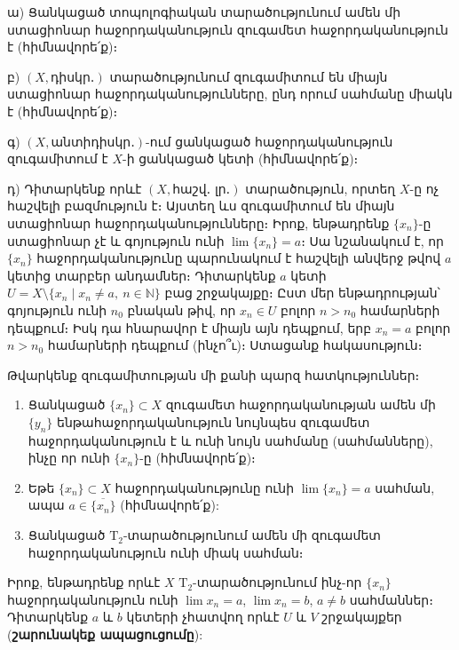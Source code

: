 \documentclass[./main.tex]{subfiles}
\begin{document}
\begin{example}\label{ch10ex1}
ա) Ցանկացած տոպոլոգիական տարածությունում ամեն մի ստա\-ցիո\-նար հա\-ջոր\-դա\-կանություն զուգամետ հաջորդականություն է (հիմնավորե՛ք)։
\par բ) $(X, \textrm{դիսկր․})$ տարածությունում զուգամիտում են միայն ստացիո\-նար հաջոր\-դա\-կանությունները, ընդ որում սահմանը միակն է (հիմնավորե՛ք)։
\par գ)  $(X, \textrm{անտիդիսկր․})$-ում ցանկացած հաջորդականություն զուգամիտում է $X$-ի ցանկացած կետի (հիմնավորե՛ք)։

\par դ) Դիտարկենք որևէ $(X, \textrm{հաշվ․ լր․})$ տարածություն, որտեղ $X$-ը ոչ հաշվելի բազ\-մու\-թյուն է։ Այստեղ ևս զուգամիտում են միայն ստացիոնար հաջորդականություն\-ները։ Իրոք, ենթադրենք $\{x_n\}$-ը ստացիոնար չէ և գոյություն ունի $\lim \{x_n\}=a$։ Սա նշանակում է, որ $\{x_n\}$ հաջորդականությունը պարունակում է հաշվելի անվերջ թվով $a$ կետից տարբեր անդամներ։ Դիտարկենք $a$ կետի $U=X \setminus \{x_n \mid x_n \neq a,\ n\in \mathbb{N}\}$ բաց շրջա\-կայքը։ Ըստ մեր ենթադրության՝ գոյություն ունի $n_0$ բնական թիվ, որ $x_n \in U$ բոլոր $n>n_0$ համարների դեպքում։ Իսկ դա հնարավոր է միայն այն դեպքում, երբ $x_n=a$ բոլոր $n>n_0$ համարների դեպքում (ինչո՞ւ)։ Ստացանք հակասություն։
\end{example}
Թվարկենք զուգամիտության մի քանի պարզ հատկություններ։
\begin{enumerate}
    \item Ցանկացած $\{x_n\} \subset X$ զուգամետ հաջորդականության ամեն մի $\{y_n\}$ ենթա\-հա\-ջոր\-դա\-կա\-նություն նույն\-պես զուգամետ հաջորդականություն է և ունի նույն սահ\-մա\-նը (սահմանները), ինչը որ ունի $\{x_n\}$-ը (հիմնավորե՛ք)։
    \item Եթե $\{x_n\} \subset X$ հաջորդականությունը ունի $\lim \{x_n\} = a$ սահման, ապա ${a \in \overline{\{x_n\}}}$ (հիմնավորե՛ք):
    \item Ցանկացած $\textrm{T}_2$-տարածությունում ամեն մի զուգամետ հաջորդա\-կա\-նու\-թյուն ունի միակ սահման։
\end{enumerate}

\par Իրոք, ենթադրենք որևէ $X$ $\textrm{T}_2$-տարածությունում ինչ-որ $\{x_n\}$ հաջորդակա\-նու\-թյուն ունի $\lim x_n = a$, $\lim x_n = b$, $a \neq b$ սահմաններ։ Դիտարկենք $a$ և $b$ կետերի չհատվող որևէ $U$ և $V$ շրջակայքեր (\textbf{շարունակեք ապացուցումը}):
\end{document}
